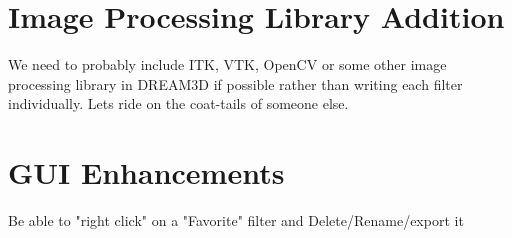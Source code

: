 \documentclass[12pt]{article} %
\begin{document}
\section{Image Processing Library Addition}
   We need to probably include ITK, VTK, OpenCV or some other image processing library in DREAM3D if possible rather than writing each filter individually. Lets ride on the coat-tails of someone else.

\section{GUI Enhancements}
   Be able to "right click" on a "Favorite" filter and Delete/Rename/export it
   
\end{document}
